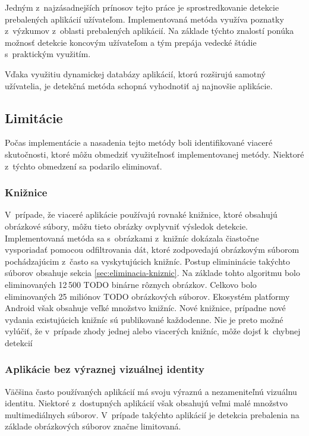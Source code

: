 Jedným z~najzásadnejších prínosov tejto práce je sprostredkovanie detekcie prebalených aplikácií užívateľom. Implementovaná metóda využíva poznatky z~výzkumov z~oblasti prebalených aplikácií. Na základe týchto znalostí ponúka možnosť detekcie koncovým užívateľom a tým prepája vedecké štúdie s~praktickým využitím. 

Vďaka využitiu dynamickej databázy aplikácií, ktorú rozširujú samotný užívatelia, je detekčná metóda schopná vyhodnotiť aj najnovšie aplikácie.

\subsection{Limitácie}
Počas implementácie a nasadenia tejto metódy boli identifikované viaceré skutočnosti, ktoré môžu obmedziť využiteľnosť implementovanej metódy. Niektoré z~týchto obmedzení sa podarilo eliminovať.

\subsubsection{\textbf{Knižnice}}
V~prípade, že viaceré aplikácie používajú rovnaké knižnice, ktoré obsahujú obrázkové súbory, môžu tieto obrázky ovplyvniť výsledok detekcie. Implementovaná metóda sa s~obrázkami z~knižníc dokázala čiastočne vysporiadať pomocou odfiltrovania dát, ktoré zodpovedajú obrázkovým súborom pochádzajúcim z~často sa vyskytujúcich knižníc. Postup elimininácie takýchto súborov obsahuje sekcia \ref{sec:eliminacia-kniznic}. Na základe tohto algoritmu bolo eliminovaných 12\,500 TODO binárne rôznych obrázkov. Celkovo bolo eliminovaných 25 miliónov TODO obrázkových súborov. Ekosystém platformy Android však obsahuje veľké množstvo knižníc. Nové knižnice, prípadne nové vydania existujúcich knižníc sú publikované každodenne. Nie je preto možné vylúčiť, že v~prípade zhody jednej alebo viacerých knižníc, môže dojsť k~chybnej detekcií

\subsubsection{\textbf{Aplikácie bez výraznej vizuálnej identity}}
Väčšina často používaných aplikácií má svoju výraznú a nezameniteľnú vizuálnu identitu. Niektoré z~dostupných aplikácií však obsahujú veľmi malé množstvo multimediálnych súborov. V~prípade takýchto aplikácií je detekcia prebalenia na základe obrázkových súborov značne limitovaná.

